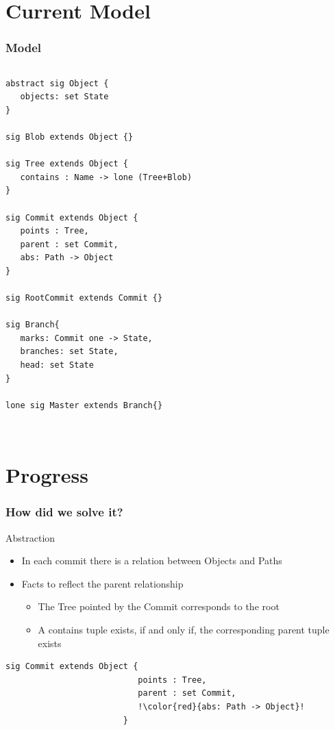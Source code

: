 \documentclass{beamer}
\begin{document}
\section{Current Model}
\begin{frame}[fragile]
   \frametitle{Model}
   \tiny
   \begin{columns}[c]
      \column{1.5in}
         \begin{lstlisting}
abstract sig Object {
   objects: set State
}

sig Blob extends Object {}

sig Tree extends Object {
   contains : Name -> lone (Tree+Blob)
}

sig Commit extends Object {
   points : Tree,
   parent : set Commit,
   abs: Path -> Object
}

sig RootCommit extends Commit {}

sig Branch{
   marks: Commit one -> State,
   branches: set State,
   head: set State
}

lone sig Master extends Branch{}
                  
         \end{lstlisting}
      \column{1.5in}
   \end{columns}
\end{frame}

\section{Progress}
\begin{frame}[fragile]
   \frametitle{How did we solve it?}
   \begin{block}{Abstraction}
      \begin{itemize}
         \item In each commit there is a relation between Objects and Paths
         \item Facts to reflect the parent relationship
            \begin{itemize}
               \item The Tree pointed by the Commit corresponds to the root
               \item A contains tuple exists, 
	       if and only if, the corresponding parent tuple exists
            \end{itemize}
      \end{itemize}
   \end{block}
   \tiny
   \begin{lstlisting}[escapechar=!]
                        sig Commit extends Object {
                           points : Tree,
                           parent : set Commit,
                           !\color{red}{abs: Path -> Object}!
                        }
  \end{lstlisting}

\end{frame}
\end{document}
